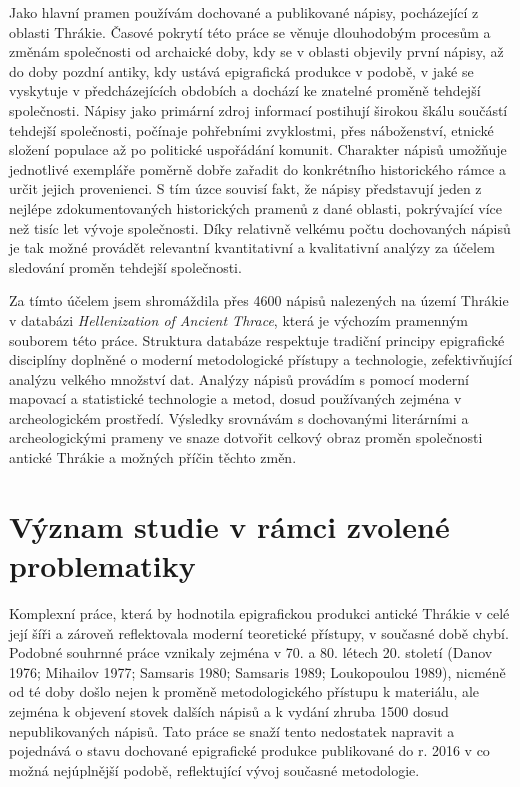 Jako hlavní pramen používám dochované a publikované nápisy, pocházející z oblasti Thrákie. Časové pokrytí této práce se věnuje dlouhodobým procesům a změnám společnosti od archaické doby, kdy se v oblasti objevily první nápisy, až do doby pozdní antiky, kdy ustává epigrafická produkce v podobě, v jaké se vyskytuje v předcházejících obdobích a dochází ke znatelné proměně tehdejší společnosti. Nápisy jako primární zdroj informací postihují širokou škálu součástí tehdejší společnosti, počínaje pohřebními zvyklostmi, přes náboženství, etnické složení populace až po politické uspořádání komunit. Charakter nápisů umožňuje jednotlivé exempláře poměrně dobře zařadit do konkrétního historického rámce a určit jejich provenienci. S tím úzce souvisí fakt, že nápisy představují jeden z nejlépe zdokumentovaných historických pramenů z dané oblasti, pokrývající více než tisíc let vývoje společnosti. Díky relativně velkému počtu dochovaných nápisů je tak možné provádět relevantní kvantitativní a kvalitativní analýzy za účelem sledování proměn tehdejší společnosti.

Za tímto účelem jsem shromáždila přes 4600 nápisů nalezených na území Thrákie v databázi {\em Hellenization of Ancient Thrace}, která je výchozím pramenným souborem této práce. Struktura databáze respektuje tradiční principy epigrafické disciplíny doplněné o moderní metodologické přístupy a technologie, zefektivňující analýzu velkého množství dat. Analýzy nápisů provádím s pomocí moderní mapovací a statistické technologie a metod, dosud používaných zejména v archeologickém prostředí. Výsledky srovnávám s dochovanými literárními a archeologickými prameny ve snaze dotvořit celkový obraz proměn společnosti antické Thrákie a možných příčin těchto změn.

\section[význam-studie-v-rámci-zvolené-problematiky]{Význam studie v rámci zvolené problematiky}

Komplexní práce, která by hodnotila epigrafickou produkci antické Thrákie v celé její šíři a zároveň reflektovala moderní teoretické přístupy, v současné době chybí. Podobné souhrnné práce vznikaly zejména v 70. a 80. létech 20. století (Danov 1976; Mihailov 1977; Samsaris 1980; Samsaris 1989; Loukopoulou 1989), nicméně od té doby došlo nejen k proměně metodologického přístupu k materiálu, ale zejména k objevení stovek dalších nápisů a k vydání zhruba 1500 dosud nepublikovaných nápisů. Tato práce se snaží tento nedostatek napravit a pojednává o stavu dochované epigrafické produkce publikované do r. 2016 v co možná nejúplnější podobě, reflektující vývoj současné metodologie.

